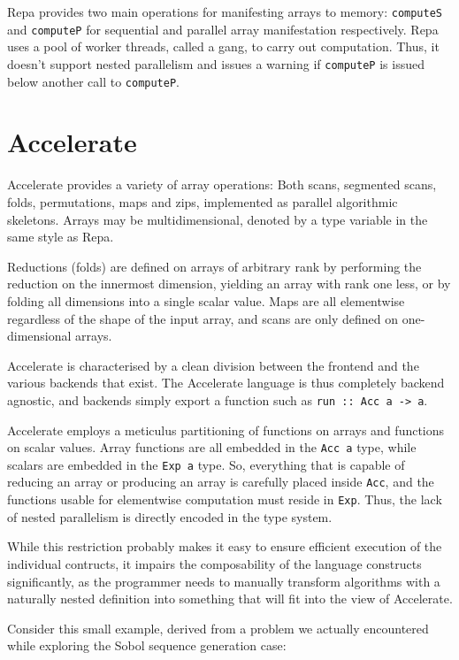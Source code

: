 Repa provides two main operations for manifesting arrays to memory:
\texttt{computeS} and \texttt{computeP} for sequential and parallel
array manifestation respectively. Repa uses a pool of worker threads,
called a gang, to carry out computation. Thus, it doesn't support
nested parallelism and issues a warning if \texttt{computeP} is issued
below another call to \texttt{computeP}.

\section{Accelerate}
\label{sec:language-discussion-accelerate}
Accelerate provides a variety of array operations: Both scans,
segmented scans, folds, permutations, maps and zips, implemented as
parallel algorithmic skeletons. Arrays may be multidimensional,
denoted by a type variable in the same style as Repa.

Reductions (folds) are defined on arrays of arbitrary rank by
performing the reduction on the innermost dimension, yielding an array
with rank one less, or by folding all dimensions into a single scalar
value.  Maps are all elementwise regardless of the shape of the input
array, and scans are only defined on one-dimensional arrays.

Accelerate is characterised by a clean division between the frontend and the
various backends that exist. The Accelerate language is thus completely backend
agnostic, and backends simply export a function such as \hbox{\texttt{run :: Acc a ->
a}.}

Accelerate employs a meticulus partitioning of functions on arrays and functions
on scalar values. Array functions are all embedded in the \texttt{Acc a} type,
while scalars are embedded in the \texttt{Exp a} type. So, everything that is
capable of reducing an array or producing an array is carefully placed inside
\texttt{Acc}, and the functions usable for elementwise computation must
reside in \texttt{Exp}. Thus, the lack of nested parallelism is directly
encoded in the type system.

While this restriction probably makes it easy to ensure efficient execution of
the individual contructs, it impairs the composability of the language
constructs significantly, as the programmer needs to manually transform
algorithms with a naturally nested definition into something that will fit into
the view of Accelerate.

Consider this small example, derived from a problem we actually encountered
while exploring the Sobol sequence generation case:

